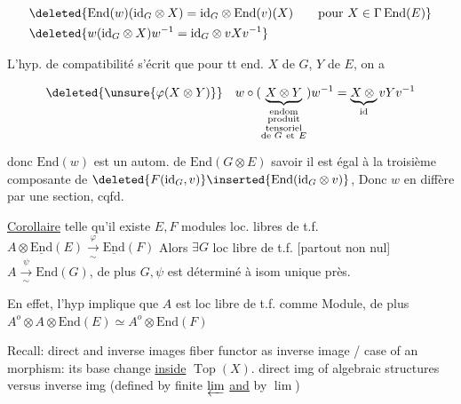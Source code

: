 \[
\begin{aligned}
&\deleted{\mathrm{End}(w)(\mathrm{id}_G\otimes X)=\mathrm{id}_G\otimes\mathrm{End}(v)(X)\qquad \text{pour }X\in\Gamma\,\mathrm{End}(E)}\\
&\deleted{w(\mathrm{id}_G\otimes X)w^{-1}=\mathrm{id}_G\otimes vXv^{-1}}
\end{aligned}
\]

L'hyp. de compatibilité
s'écrit que pour tt end. $X$ de $G$, $Y$ de $E$, on a

\[
\deleted{\unsure{\varphi(X\otimes Y)}}\quad
w\circ(\underbrace{X\otimes Y}_{\substack{\text{endom}\\\text{produit}\\\text{tensoriel}\\\text{de }G\ \mathrm{et}\ E}})w^{-1}
=\underbrace{X\otimes{}}_{\mathrm{id}}vYv^{-1}
\]

donc $\mathrm{End}(w)$ est un autom.  de $\mathrm{End}(G\otimes E)$ 
 savoir il
est égal à la troisième composante de $\deleted{F(\mathrm{id}_G,v)}\inserted{\mathrm{End}(\mathrm{id}_G\otimes v)}$, 
 Donc $w$ en diffère par une  section, cqfd.

\uline{Corollaire} 
telle qu'il existe $E,F$ modules loc. libres de t.f. 
$A\otimes\underline{\mathrm{End}}(E)\xrightarrow[\sim]{\varphi}\underline{\mathrm{End}}(F)$ 
Alors  $\exists G$ loc libre de t.f. [partout non nul]
 $A\xrightarrow[\sim]{\psi}\mathrm{End}(G)$, de plus $G,\psi$ est déterminé
à isom unique près.

En effet, l'hyp implique que $A$ est loc libre de t.f. comme
Module, de plus $A^o\otimes A\otimes\mathrm{End}(E)\simeq A^o\otimes\mathrm{End}(F)$

Recall: direct and inverse images
 fiber functor as inverse image / case of an  morphism:
its base change \uline{inside} $\operatorname{Top}(X)$.
direct img of  algebraic structures versus inverse img
(defined by finite $\varprojlim$ \uline{and} by \uline{$\lim$})

